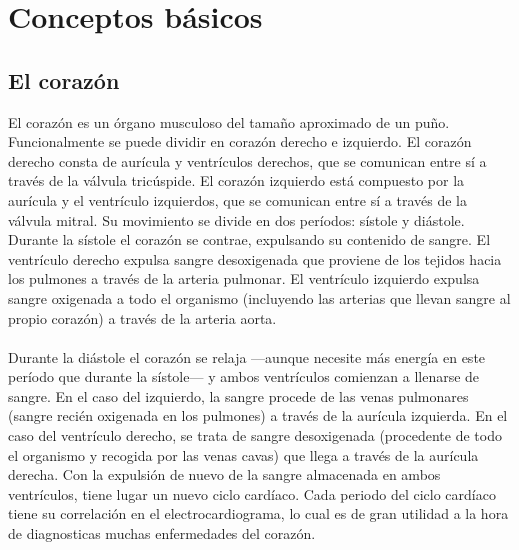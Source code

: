\documentclass[12pt,letterpaper,oneside,openright]{book}
\begin{document}
\section{Conceptos básicos}

\subsection{El corazón}
	El corazón es un órgano musculoso del tamaño aproximado de un puño. Funcionalmente se puede dividir en corazón derecho e izquierdo. El corazón derecho consta de aurícula y ventrículos derechos, que se comunican entre sí a través de la válvula tricúspide. El corazón izquierdo está compuesto por la aurícula y el ventrículo izquierdos, que se comunican entre sí a través de la válvula mitral. Su movimiento se divide en dos períodos: sístole y diástole. Durante la sístole el corazón se contrae, expulsando su contenido de sangre. El ventrículo derecho expulsa sangre desoxigenada que proviene de los tejidos hacia los pulmones a través de la arteria pulmonar. El ventrículo izquierdo expulsa sangre oxigenada a todo el organismo (incluyendo las arterias que llevan sangre al propio corazón) a través de la arteria aorta. \\
	\\
	Durante la diástole el corazón se relaja ---aunque necesite más energía en este período que durante la sístole--- y ambos ventrículos comienzan a llenarse de sangre. En el caso del izquierdo, la sangre procede de las venas pulmonares (sangre recién oxigenada en los pulmones) a través de la aurícula izquierda. En el caso del ventrículo derecho, se trata de sangre desoxigenada (procedente de todo el organismo y recogida por las venas cavas) que llega a través de la aurícula derecha. Con la expulsión de nuevo de la sangre almacenada en ambos ventrículos, tiene lugar un nuevo ciclo cardíaco. Cada periodo del ciclo cardíaco tiene su correlación en el electrocardiograma, lo cual es de gran utilidad a la hora de diagnosticas muchas enfermedades del corazón.\cite{fbbva}
\end{document}

